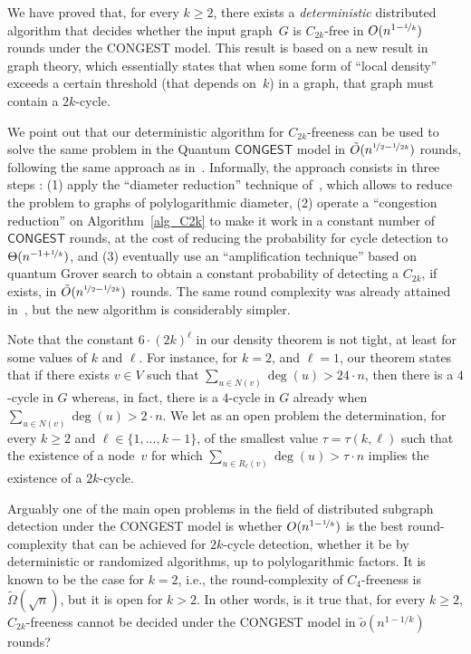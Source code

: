 \documentclass{article}
\newcommand{\lebontau}{6\cdot (2k)^\ell}
\newcommand{\CONGEST}{\textsf{CONGEST}}
\begin{document}
We have proved that, for every $k\geq 2$, there exists a \emph{deterministic} distributed algorithm that decides whether the input graph~$G$ is $C_{2k}$-free in $O(n^{1-\nicefrac{1}{k}})$ rounds under the \CONGEST\/ model. This result is based on a new result in graph theory, which essentially states that when some form of  ``local density'' exceeds a certain threshold (that depends on~$k$) in a graph, that graph must contain a $2k$-cycle. 

We point out that our deterministic algorithm for $C_{2k}$-freeness can be used to solve the same problem in the Quantum $\CONGEST$ model in $\tilde{O}(n^{\nicefrac{1}{2}-\nicefrac{1}{2k}})$ rounds, following the same approach as in~\cite{FraigniaudLMT24}. Informally, the approach consists in three steps : (1) apply the “diameter reduction” technique of~\cite{eden2022sublinear}, which allows to reduce the problem to graphs of polylogarithmic diameter, (2) operate a “congestion reduction” on Algorithm~\ref{alg_C2k} to make it work in a constant number of $\CONGEST$ rounds, at the cost of reducing the probability for cycle detection to $\Theta(n^{-1+\nicefrac{1}{k}})$, and (3) eventually use an “amplification technique” based on quantum Grover search to obtain a constant probability of detecting a $C_{2k}$, if exists, in $\tilde{O}(n^{\nicefrac{1}{2}-\nicefrac{1}{2k}})$ rounds. The same round complexity was already attained in~\cite{FraigniaudLMT24}, but the new algorithm is considerably simpler.

Note that the constant $\lebontau$ in our density theorem is not tight, at least for some values of $k$ and $\ell$. For instance, for $k=2$, and $\ell=1$, our theorem states that if there exists $v\in V$ such that $\sum_{u\in N(v)}\deg(u) > 24\cdot n$, then there is a $4$-cycle in $G$ whereas, in fact, there is a $4$-cycle in $G$ already when $\sum_{u\in N(v)}\deg(u) > 2\cdot n$. We let as an open problem the determination, for every $k\geq 2$ and $\ell\in\{1,\dots,k-1\}$, of the smallest value $\tau=\tau(k,\ell)$ such that the existence of a node~$v$ for which $\sum_{u\in R_\ell(v)}\deg(u) > \tau \cdot n$ implies the existence of a $2k$-cycle. 

Arguably one of the main open problems in the field of distributed subgraph detection under the \CONGEST\/ model is whether $O(n^{1-\nicefrac{1}{k}})$ is the best round-complexity that can be achieved for $2k$-cycle detection, whether it be by deterministic or randomized algorithms, up to polylogarithmic factors. It is known to be the case for $k=2$, i.e., the round-complexity of $C_4$-freeness is $\tilde\Omega(\sqrt{n})$, but it is open for $k>2$. In other words, is it true that, for every $k\geq 2$, $C_{2k}$-freeness cannot be decided under the \CONGEST\/ model in $\tilde o(n^{1-1/k})$ rounds? 




\end{document}

